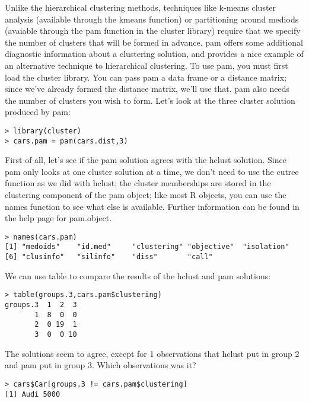 {Unlike the hierarchical clustering methods, techniques like k-means cluster analysis (available through the kmeans function) or partitioning around mediods (avaiable through the pam function in the cluster library) require that we specify the number of clusters that will be formed in advance. pam offers some additional diagnostic information about a clustering solution, and provides a nice example of an alternative technique to hierarchical clustering. To use pam, you must first load the cluster library. You can pass pam a data frame or a distance matrix; since we've already formed the distance matrix, we'll use that. pam also needs the number of clusters you wish to form. Let's look at the three cluster solution produced by pam:
\begin{framed}
\begin{verbatim}
> library(cluster)
> cars.pam = pam(cars.dist,3)
\end{verbatim}
\end{framed}
First of all, let's see if the pam solution agrees with the hclust solution. Since pam only looks at one cluster solution at a time, we don't need to use the cutree function as we did with hclust; the cluster memberships are stored in the clustering component of the pam object; like most R objects, you can use the names function to see what else is available. Further information can be found in the help page for pam.object.
\begin{framed}
\begin{verbatim}
> names(cars.pam)
[1] "medoids"    "id.med"     "clustering" "objective"  "isolation"
[6] "clusinfo"   "silinfo"    "diss"       "call"
\end{verbatim}
\end{framed}
We can use table to compare the results of the hclust and pam solutions:
\begin{framed}
\begin{verbatim}
> table(groups.3,cars.pam$clustering)
groups.3  1  2  3
       1  8  0  0
       2  0 19  1
       3  0  0 10
\end{verbatim}
\end{framed}
The solutions seem to agree, except for 1 observations that hclust put in group 2 and pam put in group 3. Which observations was it?
\begin{framed}
\begin{verbatim}
> cars$Car[groups.3 != cars.pam$clustering]
[1] Audi 5000
\end{verbatim}
\end{framed}
}
